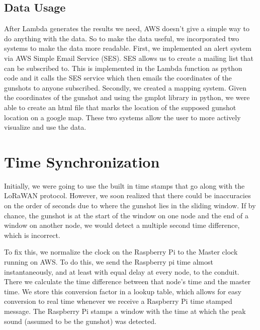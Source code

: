 \documentclass[conference]{IEEEtran}
\begin{document}
\subsection {Data Usage}
After Lambda generates the results we need, AWS doesn't give a simple way to do anything with the data. So to make the data useful, we incorporated two systems to make the data more readable. First, we implemented an alert system via AWS Simple Email Service (SES). SES allows us to create a mailing list that can be subscribed to. This is implemented in the Lambda function as python code and it calls the SES service which then emails the coordinates of the gunshots to anyone  subscribed. Secondly, we created a mapping system. Given the coordinates of the gunshot and using the gmplot library in python, we were able to create an html file that marks the location of the supposed gunshot location on a google map. These two systems allow the user to more actively visualize and use the data.

\section{Time Synchronization}
Initially, we were going to use the built in time stamps that go along with the LoRaWAN protocol. However, we soon realized that there could be inaccuracies on the order of seconds due to where the gunshot lies in the sliding window. If by chance, the gunshot is at the start of the window on one node and the end of a window on another node, we would detect a multiple second time difference, which is incorrect. 

To fix this, we normalize the clock on the Raspberry Pi to the Master clock running on AWS. To do this, we send the Raspberry pi time almost instantaneously, and at least with equal delay at every node, to the conduit. There we calculate the time difference between that node’s time and the master time. We store this conversion factor in a lookup table, which allows for easy conversion to real time whenever we receive a Raspberry Pi time stamped message. The Raspberry Pi stamps a window with the time at which the peak sound (assumed to be the gunshot) was detected.
\end{document}
